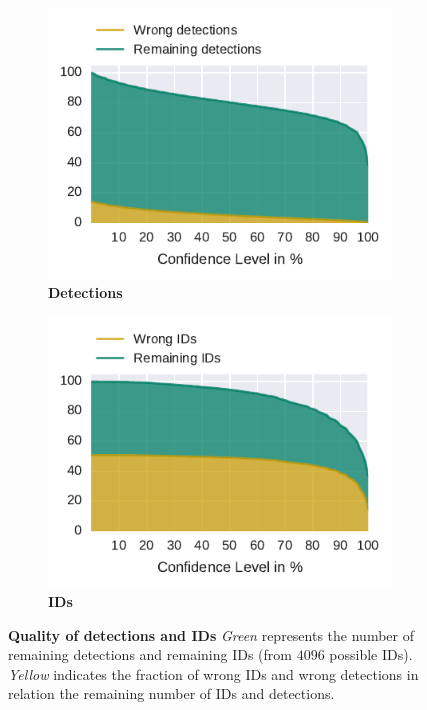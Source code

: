 \begin{figure}
    \centering
    \begin{subfigure}[b]{0.45\textwidth}
        \includegraphics[width=\textwidth]{Figures/detectionsWrongConf}
        \caption[Detections]{\textbf{Detections}}
        \label{fig:detections}
    \end{subfigure}
    \begin{subfigure}[b]{0.45\textwidth}
        \includegraphics[width=\textwidth]{Figures/idsWrongConf}
        \caption[IDs]{\textbf{IDs}}
        \label{fig:ids}
    \end{subfigure}
 	\caption[Quality of detections and IDs]{\textbf{Quality of detections and IDs} \emph{Green} represents the number of remaining detections and remaining IDs (from $4096$ possible IDs). \emph{Yellow} indicates the fraction of wrong IDs and wrong detections in relation the remaining number of IDs and detections.\protect\footnotemark}
 	\label{fig:remainingVSquality}
\end{figure}

